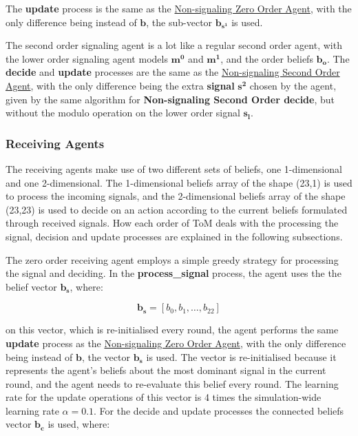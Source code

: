 The \textbf{update} process is the same as the \hyperref[eq:zero-order-update]{Non-signaling Zero Order Agent}, with the only difference being instead of $\mathbf{b}$, the sub-vector $\mathbf{b_{s^1}}$ is used.


The second order signaling agent is a lot like a regular second order agent, with the lower order signaling agent models $\mathbf{m^0}$ and $\mathbf{m^1}$, and the order beliefs $\mathbf{b_o}$. The \textbf{decide} and \textbf{update} processes are the same as the \hyperref[eq:second-order-decide]{Non-signaling Second Order Agent}, with the only difference being the extra \textbf{signal} $\mathbf{s^2}$ chosen by the agent, given by the same algorithm for \textbf{Non-signaling Second Order decide}, but without the modulo operation on the lower order signal $\mathbf{s_l}$.

\subsubsection{Receiving Agents}

The receiving agents make use of two different sets of beliefs, one 1-dimensional and one 2-dimensional. The 1-dimensional beliefs array of the shape (23,1) is used to process the incoming signals, and the 2-dimensional beliefs array of the shape (23,23) is used to decide on an action according to the current beliefs formulated through received signals. How each order of ToM deals with the processing the signal, decision and update processes are explained in the following subsections.


The zero order receiving agent employs a simple greedy strategy for processing the signal and deciding. In the \textbf{process\_signal} process, the agent uses the the belief vector $\mathbf{b_s}$, where:

\[
\mathbf{b_s} = [b_{0}, b_{1}, \ldots, b_{22}]
\]

on this vector, which is re-initialised every round, the agent performs the same \textbf{update} process as the \hyperref[eq:zero-order-update]{Non-signaling Zero Order Agent}, with the only difference being instead of $\mathbf{b}$, the vector $\mathbf{b_s}$ is used. The vector is re-initialised because it represents the agent's beliefs about the most dominant signal in the current round, and the agent needs to re-evaluate this belief every round. The learning rate for the update operations of this vector is 4 times the simulation-wide learning rate $\alpha = 0.1$.
For the decide and update processes the connected beliefs vector $\mathbf{b_c}$ is used, where:

